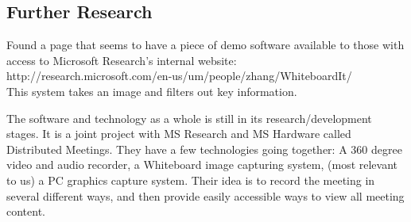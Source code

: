 \documentclass[]{article}
\begin{document}
		\subsection{Further Research}
			Found a page that seems to have a piece of demo software available to those with access to Microsoft Research’s internal website:\\
			http://research.microsoft.com/en-us/um/people/zhang/WhiteboardIt/\\
			This system takes an image and filters out key information.
			
			The software and technology as a whole is still in its research/development stages. It is a joint project with MS Research and MS Hardware called Distributed Meetings. They have a few technologies going together: A 360 degree video and audio recorder, a Whiteboard image capturing system, (most relevant to us) a PC graphics capture system. Their idea is to record the meeting in several different ways, and then provide easily accessible ways to view all meeting content.
		
\end{document}
